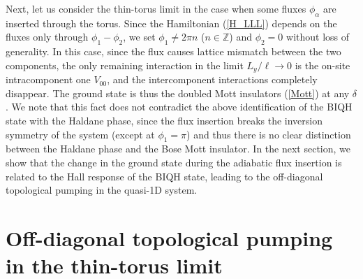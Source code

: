 \documentclass[aps,prb,twocolumn,superscriptaddress,showpacs,floatfix]{revtex4-1}
\begin{document}
Next, let us consider the thin-torus limit in the case when some fluxes $\phi_\alpha$ are inserted through the torus. 
Since the Hamiltonian (\ref{H_LLL}) depends on the fluxes only through $\phi_1-\phi_2$, we set $\phi_1\neq 2\pi n$ ($n\in\mathbb{Z}$) and $\phi_2=0$ without loss of generality. In this case, since the flux causes lattice mismatch between the two components, 
the only remaining interaction in the limit $L_y/\ell \to 0$ is the on-site intracomponent one $V_{00}$, and the intercomponent interactions completely disappear. 
The ground state is thus the doubled Mott insulators (\ref{Mott}) at any $\delta$. We note that this fact does not contradict the above identification of the BIQH state with the Haldane phase, since the flux insertion breaks the inversion symmetry of the system (except at $\phi_1=\pi$) and thus there is no clear distinction between the Haldane phase and the Bose Mott insulator.\cite{DallaTorre, Berg, BergLevinAltman} 
In the next section, we show that the change in the ground state during the adiabatic flux insertion is related to the Hall response of the BIQH state, leading to the off-diagonal topological pumping in the quasi-1D system.

\section{Off-diagonal topological pumping in the thin-torus limit \label{Berryphase}}
\end{document}
